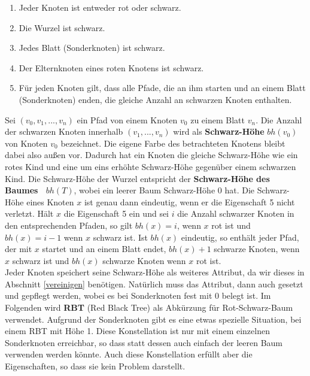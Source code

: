 \documentclass[a4paper,12pt]{article}
\begin{document}
\begin{enumerate}
	\item Jeder Knoten ist entweder rot oder schwarz.
	\item Die Wurzel ist schwarz.
	\item Jedes Blatt (Sonderknoten) ist schwarz.
	\item Der Elternknoten eines roten Knotens ist schwarz.
	\item Für jeden Knoten gilt, dass alle Pfade, die an ihm starten und an einem Blatt (Sonderknoten) enden, die gleiche Anzahl an schwarzen Knoten enthalten. 
\end{enumerate}  
Sei $(v_0,v_1,...,v_n)$ ein Pfad von einem Knoten $v_0$ zu einem Blatt $v_n$. Die Anzahl der schwarzen Knoten innerhalb $(v_1,...,v_n)$ wird als \textbf{Schwarz-Höhe} $\mathit{bh(v_0)}$ von Knoten $v_0$ bezeichnet. Die eigene Farbe des betrachteten Knotens bleibt dabei also außen vor. Dadurch hat ein Knoten die gleiche Schwarz-Höhe wie ein rotes Kind und eine um eins erhöhte Schwarz-Höhe gegenüber einem schwarzen Kind. Die Schwarz-Höhe der Wurzel entspricht der \textbf{Schwarz-Höhe des Baumes~ $bh(T)$}, wobei ein leerer Baum Schwarz-Höhe $0$ hat. Die Schwarz-Höhe eines Knoten $x$ ist genau dann eindeutig, wenn er die Eigenschaft 5 nicht verletzt. Hält $x$ die Eigenschaft 5 ein und sei $i$ die Anzahl schwarzer Knoten in den entsprechenden Pfaden, so gilt $\mathit{bh(x)} = i$, wenn $x$ rot ist und $\mathit{bh(x)} = i - 1$ wenn $x$ schwarz ist. Ist $\mathit{bh(x)}$ eindeutig, so enthält jeder Pfad, der mit $x$ startet und an einem Blatt endet, $\mathit{bh(x)} + 1$ schwarze Knoten, wenn $x$ schwarz ist und  $\mathit{bh(x)}$ schwarze Knoten wenn $x$ rot ist.\\ Jeder Knoten speichert seine Schwarz-Höhe als weiteres Attribut, da wir dieses in Abschnitt \ref{vereinigen} benötigen. Natürlich muss das Attribut, dann auch gesetzt und gepflegt werden, wobei es bei Sonderknoten fest mit $0$ belegt ist. Im Folgenden wird \textbf{RBT} (Red Black Tree) als Abkürzung für Rot-Schwarz-Baum verwendet. Aufgrund der Sonderknoten gibt es eine etwas spezielle Situation, bei einem RBT mit Höhe 1. Diese Konstellation ist nur mit einem einzelnen Sonderknoten erreichbar, so dass statt dessen auch einfach der leeren Baum verwenden werden könnte. Auch diese Konstellation erfüllt aber die Eigenschaften, so dass sie kein Problem darstellt. \\
\end{document}
